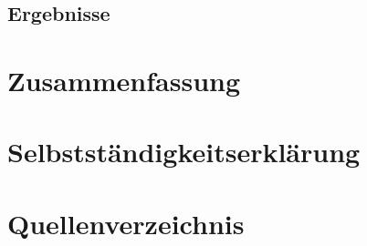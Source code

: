 \documentclass[a4paper, 12pt]{article}
\begin{document}
\subsection{Ergebnisse}
\label{sec:Ergebnisse}

\section{Zusammenfassung}
\label{sec:Zusammenfassung}

\newpage
\section{Selbstständigkeitserklärung}

\newpage
\section{Quellenverzeichnis}
%
\printbibliography[keyword={internet},title={Internetseiten?}]
\printbibliography[keyword={buch},title={Literatur}]
\end{document}
